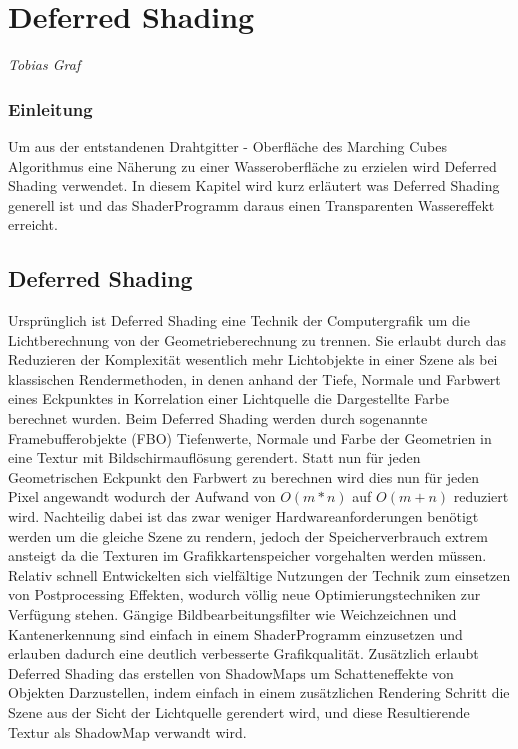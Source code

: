 \pagebreak
\section{Deferred Shading}

\begin{center}
\emph{{\small Tobias Graf}}
\end{center}

\bigskip

\subsubsection*{Einleitung} Um aus der entstandenen Drahtgitter - Oberfläche des Marching Cubes Algorithmus eine Näherung zu einer Wasseroberfläche zu erzielen wird Deferred Shading verwendet. In diesem Kapitel wird kurz erläutert was Deferred Shading generell ist und das ShaderProgramm daraus einen Transparenten Wassereffekt erreicht.

\subsection*{Deferred Shading} Ursprünglich ist Deferred Shading eine Technik der Computergrafik um die Lichtberechnung von der Geometrieberechnung zu trennen. Sie erlaubt durch das Reduzieren der Komplexität wesentlich mehr Lichtobjekte in einer Szene als bei klassischen Rendermethoden, in denen anhand der Tiefe, Normale und Farbwert eines Eckpunktes in Korrelation einer Lichtquelle die Dargestellte Farbe berechnet wurden. Beim Deferred Shading werden durch sogenannte Framebufferobjekte (FBO) Tiefenwerte, Normale und Farbe der Geometrien in eine Textur mit Bildschirmauflösung gerendert. Statt nun für jeden Geometrischen Eckpunkt den Farbwert zu berechnen wird dies nun für jeden Pixel angewandt wodurch der Aufwand von $O(m*n)$ auf $O(m+n)$ reduziert wird. Nachteilig dabei ist das zwar weniger Hardwareanforderungen benötigt werden um die gleiche Szene zu rendern, jedoch der Speicherverbrauch extrem ansteigt da die Texturen im Grafikkartenspeicher vorgehalten werden müssen.\\
Relativ schnell Entwickelten sich vielfältige Nutzungen der Technik zum einsetzen von Postprocessing Effekten, wodurch völlig neue Optimierungstechniken zur Verfügung stehen. Gängige Bildbearbeitungsfilter wie Weichzeichnen und Kantenerkennung sind einfach in einem ShaderProgramm einzusetzen und erlauben dadurch eine deutlich verbesserte Grafikqualität.
Zusätzlich erlaubt Deferred Shading das erstellen von ShadowMaps um Schatteneffekte von Objekten Darzustellen, indem einfach in einem zusätzlichen Rendering Schritt die Szene aus der Sicht der Lichtquelle gerendert wird, und diese Resultierende Textur als ShadowMap verwandt wird.

